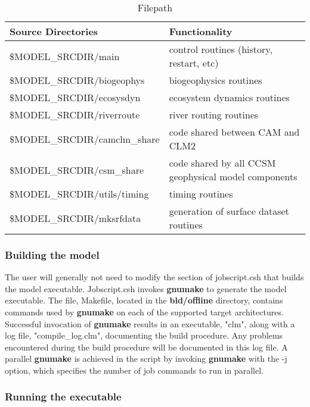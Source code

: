 \medskip
\begin{longtable}{|p{2.5in}|p{3.5in}|} 
\caption{\label{Filepath} Filepath} \\
\hline
\endhead
\hline
{\bf Source Directories}          & {\bf Functionality} \\ \hline
  \$MODEL\_SRCDIR/main            & control routines (history, restart, etc) \\ \hline
  \$MODEL\_SRCDIR/biogeophys      & biogeophysics routines \\ \hline
  \$MODEL\_SRCDIR/ecosysdyn       & ecosystem dynamics routines \\ \hline
  \$MODEL\_SRCDIR/riverroute      & river routing routines \\ \hline
  \$MODEL\_SRCDIR/camclm\_share   & code shared between CAM and CLM2 \\ \hline
  \$MODEL\_SRCDIR/csm\_share      & code shared by all CCSM geophysical model components \\ \hline
  \$MODEL\_SRCDIR/utils/timing    & timing routines \\ \hline
  \$MODEL\_SRCDIR/mksrfdata       & generation of surface dataset routines \\ \hline
\end{longtable}
\medskip

\subsubsection {Building the model}
\label{subsub_build} 

The user will generally not need to modify the section of
jobscript.csh that builds the model executable.  Jobscript.csh invokes
{\bf gnumake} to generate the model executable. The file, Makefile,
located in the {\bf bld/offline} directory, contains commands used by
{\bf gnumake} on each of the supported target
architectures. Successful invocation of {\bf gnumake} results in an
executable, "clm", along with a log file, "compile\_log.clm",
documenting the build procedure.  Any problems encountered during the
build procedure will be documented in this log file.  A parallel {\bf
gnumake} is achieved in the script by invoking {\bf gnumake} with the
-j option, which specifies the number of job commands to run in
parallel.

\subsubsection {Running the executable}

